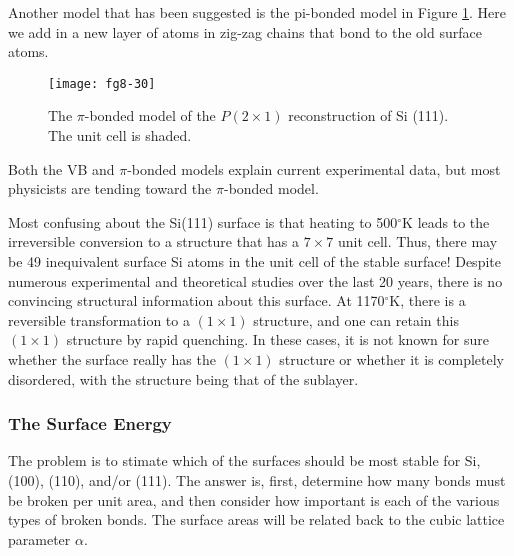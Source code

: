 Another model that has been suggested is the pi-bonded model in Figure 
\ref{chap8-fig30}.  Here we add in a new layer of atoms in zig-zag
chains that bond to the old surface atoms.

\begin{figure}
\begin{center}
\texttt{[image: fg8-30]}
\end{center}
\caption{The $\pi$-bonded model of the $P(2 \times 1)$ 
reconstruction of Si (111).  The unit cell is shaded.  }
\label{chap8-fig30}
\end{figure}

Both the VB and $\pi$-bonded models explain current experimental data,
but most physicists are tending toward the $\pi$-bonded model.

Most confusing about the Si(111) surface is that heating to 
500$^{\circ}$K leads to the irreversible conversion to a structure 
that has a $7 \times 7$ unit cell.  Thus, there may be 49 
inequivalent surface Si atoms in the unit cell of the stable surface! 
Despite numerous experimental and theoretical
studies over the last 20 years, there is no convincing structural 
information about this surface.  At
1170$^{\circ}$K, there is a reversible transformation to a $(1 \times 
1)$ structure, and one can retain this $(1 \times 1)$
structure by rapid quenching.  In these cases, it is not known for sure 
whether the surface really has the $(1 \times 1)$ structure or whether 
it is completely disordered, with the structure being that of
the sublayer.

\subsubsection{The Surface Energy}

The problem is to stimate which of the surfaces should be most stable for Si, 
(100), (110), and/or (111).  The answer is, first,
determine how many bonds must be broken per unit area, and then 
consider how important is each of the various types of broken bonds.
The surface areas will be related back to the cubic lattice 
parameter $\alpha$.

